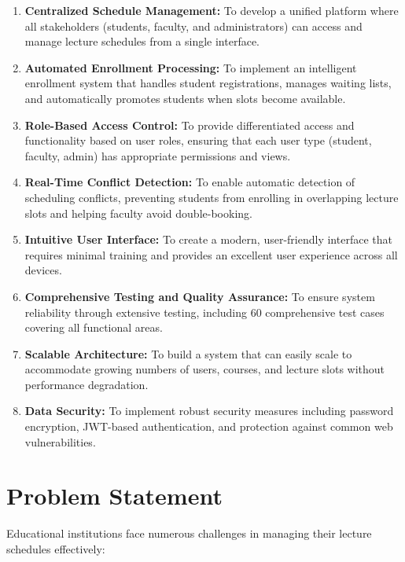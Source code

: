 \documentclass[12pt,a4paper]{report}
\begin{document}
\begin{enumerate}[leftmargin=*]
    \item \textbf{Centralized Schedule Management:} To develop a unified platform where all stakeholders (students, faculty, and administrators) can access and manage lecture schedules from a single interface.
    
    \item \textbf{Automated Enrollment Processing:} To implement an intelligent enrollment system that handles student registrations, manages waiting lists, and automatically promotes students when slots become available.
    
    \item \textbf{Role-Based Access Control:} To provide differentiated access and functionality based on user roles, ensuring that each user type (student, faculty, admin) has appropriate permissions and views.
    
    \item \textbf{Real-Time Conflict Detection:} To enable automatic detection of scheduling conflicts, preventing students from enrolling in overlapping lecture slots and helping faculty avoid double-booking.
    
    \item \textbf{Intuitive User Interface:} To create a modern, user-friendly interface that requires minimal training and provides an excellent user experience across all devices.
    
    \item \textbf{Comprehensive Testing and Quality Assurance:} To ensure system reliability through extensive testing, including 60 comprehensive test cases covering all functional areas.
    
    \item \textbf{Scalable Architecture:} To build a system that can easily scale to accommodate growing numbers of users, courses, and lecture slots without performance degradation.
    
    \item \textbf{Data Security:} To implement robust security measures including password encryption, JWT-based authentication, and protection against common web vulnerabilities.
\end{enumerate}

\section{Problem Statement}
Educational institutions face numerous challenges in managing their lecture schedules effectively:
\end{document}
